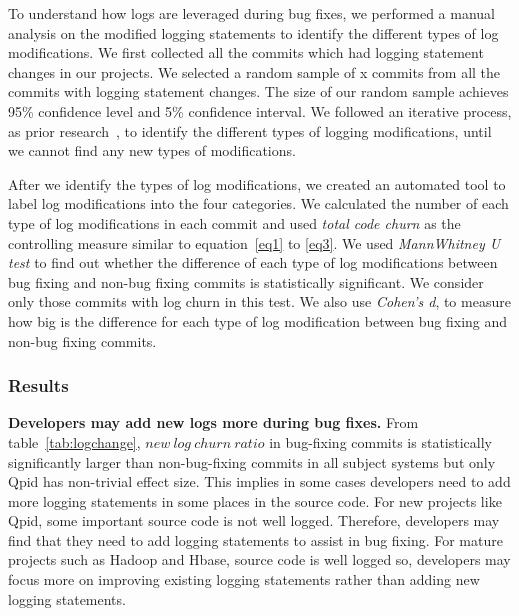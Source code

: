 To understand how logs are leveraged during bug fixes, we performed a manual analysis on the modified logging statements to identify the different types of log modifications. We first collected all the commits which had logging statement changes in our projects. We selected a random sample of x commits from all the commits with logging statement changes. The size of our random sample achieves 95\% confidence level and 5\% confidence interval. We followed an iterative process, as prior research~\cite{Seaman}, to identify the different types of logging modifications, until we cannot find any new types of modifications. 

After we identify the types of log modifications, we created an automated tool to label log modifications into the four categories. We calculated the number of each type of log modifications in each commit and used {\em total code churn } as the controlling measure similar to equation~\ref{eq1} to \ref{eq3}. We used {\em MannWhitney U test} to find out whether the difference of each type of log modifications between bug fixing and non-bug fixing commits is statistically significant. We consider only those commits with log churn in this test. We also use {\em Cohen's d}, to measure how big is the difference for each type of log modification between bug fixing and non-bug fixing commits.



\subsubsection*{\textbf{Results}}


\textbf{Developers may add new logs more during bug fixes.} From table~\ref{tab:logchange}, $new\ log\ churn\ ratio$ in bug-fixing commits is statistically significantly larger than non-bug-fixing commits in all subject systems but only Qpid has non-trivial effect size. This implies in some cases developers need to add more logging statements in some places in the source code. For new projects like Qpid, some important source code is not well logged. Therefore, developers may find that they need to add logging statements to assist in bug fixing. For mature projects such as Hadoop and Hbase, source code is well logged so, developers may focus more on improving existing logging statements rather than adding new logging statements.


